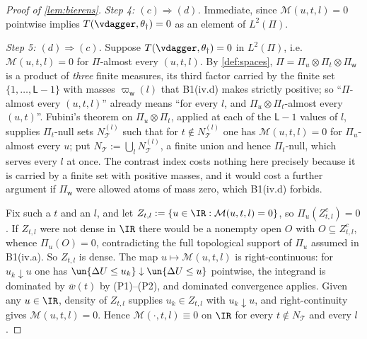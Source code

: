 \begin{proof}[Proof of \cref{lem:bierens}]
\emph{Step 4: $(c)\Rightarrow(d)$.}
Immediate, since $\mathcal M(u,t,l)=0$ pointwise implies $T(\vdagger,\theta_\dagger)=0$ as an element of
$L^{2}(\Pi)$.

\emph{Step 5: $(d)\Rightarrow(c)$.}
Suppose $T(\vdagger,\theta_\dagger)=0$ in $L^{2}(\Pi)$, i.e.\ $\mathcal M(u,t,l)=0$ for $\Pi$-almost
every $(u,t,l)$. By \cref{def:spaces}, $\Pi=\Pi_u\otimes\Pi_t\otimes\Pi_{\mathsf w}$ is a product of
\emph{three} finite measures, its third factor carried by the finite set $\{1,\dots,\mathsf L-1\}$ with
masses $\varpi_{\mathsf w}(l)$ that B1(iv.d) makes strictly positive; so ``$\Pi$-almost every $(u,t,l)$''
already means ``for every $l$, and $\Pi_u\otimes\Pi_t$-almost every $(u,t)$''. Fubini's theorem on
$\Pi_u\otimes\Pi_t$, applied at each of the $\mathsf L-1$ values of $l$, supplies $\Pi_t$-null sets
$N^{(l)}_{\mathcal T}$ such that for $t\notin N^{(l)}_{\mathcal T}$ one has $\mathcal M(u,t,l)=0$ for
$\Pi_u$-almost every $u$; put $N_{\mathcal T}:=\bigcup_lN^{(l)}_{\mathcal T}$, a finite union and hence
$\Pi_t$-null, which serves every $l$ at once. The contrast index costs nothing here precisely
because it is carried by a finite set with positive masses, and it would cost a further argument if
$\Pi_{\mathsf w}$ were allowed atoms of mass zero, which B1(iv.d) forbids.

Fix such a $t$ and an $l$, and let $Z_{t,l}:=\{u\in\IR:\mathcal M(u,t,l)=0\}$, so $\Pi_u(Z_{t,l}^{c})=0$.
If $Z_{t,l}$ were not
dense in $\IR$ there would be a nonempty open $O$ with $O\subseteq Z_{t,l}^{c}$, whence $\Pi_u(O)=0$,
contradicting the full topological support of $\Pi_u$ assumed in B1(iv.a). So $Z_{t,l}$ is dense. The map
$u\mapsto\mathcal M(u,t,l)$ is right-continuous: for $u_k\downarrow u$ one has
$\un\{\Delta U\le u_k\}\downarrow\un\{\Delta U\le u\}$ pointwise, the integrand is dominated by
$\bar w(t)$ by (P1)--(P2), and dominated convergence applies. Given any $u\in\IR$, density of $Z_{t,l}$
supplies $u_k\in Z_{t,l}$ with $u_k\downarrow u$, and right-continuity gives $\mathcal M(u,t,l)=0$. Hence
$\mathcal M(\cdot,t,l)\equiv0$ on $\IR$ for every $t\notin N_{\mathcal T}$ and every $l$.


\end{proof}
